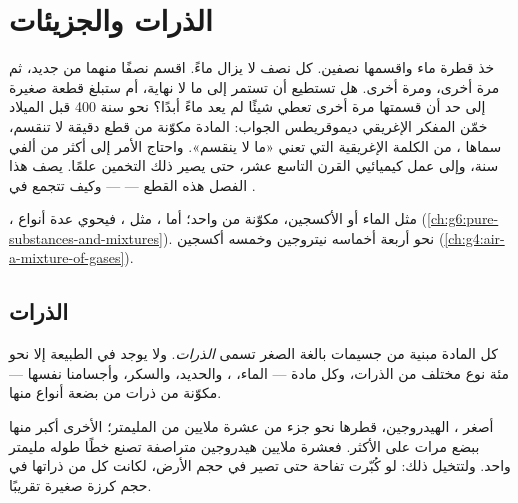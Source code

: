 \chapter{الذرات والجزيئات}\label{ch:g7:atoms-and-molecules}

خذ قطرة ماء واقسمها نصفين. كل نصف لا يزال ماءً. اقسم نصفًا منهما من
جديد، ثم مرة أخرى، ومرة أخرى. هل تستطيع أن تستمر إلى ما لا نهاية، أم
ستبلغ قطعة صغيرة إلى حد أن قسمتها مرة أخرى تعطي شيئًا لم يعد ماءً
أبدًا؟ نحو سنة 400 قبل الميلاد خمّن المفكر الإغريقي ديموقريطس الجواب:
المادة مكوّنة من قطع دقيقة لا تنقسم، سماها \emph{}، من الكلمة
الإغريقية التي تعني «ما لا ينقسم». واحتاج الأمر إلى أكثر من ألفي سنة،
وإلى عمل كيميائيي القرن التاسع عشر، حتى يصير ذلك التخمين علمًا. يصف هذا
الفصل هذه القطع ---  --- وكيف تتجمع في .

\begin{recall}
، مثل الماء أو الأكسجين، مكوّنة من  واحد؛ أما
، مثل ، فيحوي عدة أنواع
(\cref{ch:g6:pure-substances-and-mixtures}).  نحو أربعة أخماسه
نيتروجين وخمسه أكسجين (\cref{ch:g4:air-a-mixture-of-gases}).
\end{recall}

\section{الذرات}

\begin{definition}[الذرة]\label{def:g7:atoms-and-molecules:atom}
كل المادة مبنية من جسيمات بالغة الصغر تسمى
\emph{الذرات}. ولا يوجد في الطبيعة إلا نحو مئة نوع مختلف من
الذرات، وكل مادة --- الماء، ، والحديد، والسكر، وأجسامنا نفسها ---
مكوّنة من ذرات من بضعة أنواع منها.
\end{definition}

\begin{proposition}\label{prop:g7:atoms-and-molecules:tiny}
أصغر ،  الهيدروجين، قطرها نحو جزء من عشرة ملايين من
المليمتر؛  الأخرى أكبر منها ببضع مرات على الأكثر. فعشرة ملايين 
هيدروجين متراصفة تصنع خطًا طوله مليمتر واحد. ولتتخيل ذلك: لو كُبّرت تفاحة
حتى تصير في حجم الأرض، لكانت كل  من ذراتها في حجم كرزة صغيرة
تقريبًا.
\end{proposition}

